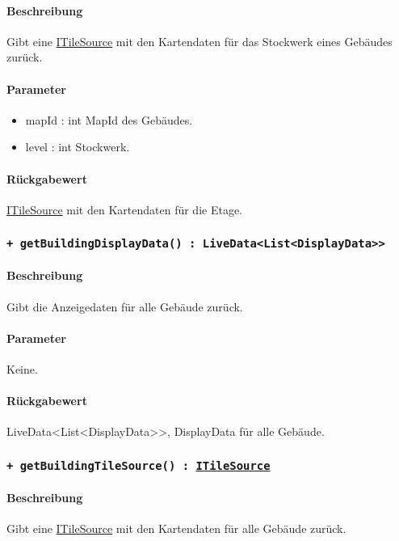 \paragraph*{Beschreibung}
Gibt eine \href{https://osmdroid.github.io/osmdroid/javadocAll/org/osmdroid/tileprovider/tilesource/ITileSource.html}
{ITileSource} mit den Kartendaten für das Stockwerk eines Gebäudes zurück.
\paragraph*{Parameter}
\begin{itemize}
    \item mapId : int MapId des Gebäudes.
    \item level : int Stockwerk.
\end{itemize}
\paragraph*{Rückgabewert}
\href{https://osmdroid.github.io/osmdroid/javadocAll/org/osmdroid/tileprovider/tilesource/ITileSource.html}
{ITileSource} mit den Kartendaten für die Etage.

\subsubsection{\texttt{+ getBuildingDisplayData() : LiveData<List<DisplayData>>}}%
\paragraph*{Beschreibung}
Gibt die Anzeigedaten für alle Gebäude zurück.
\paragraph*{Parameter}
Keine.
\paragraph*{Rückgabewert}
LiveData<List<DisplayData>>, DisplayData für alle Gebäude.

\subsubsection{\texttt{+ getBuildingTileSource() : \href{https://osmdroid.github.io/osmdroid/javadocAll/org/osmdroid/tileprovider/tilesource/ITileSource.html}
{ITileSource}}}%
\paragraph*{Beschreibung}
Gibt eine \href{https://osmdroid.github.io/osmdroid/javadocAll/org/osmdroid/tileprovider/tilesource/ITileSource.html}
{ITileSource} mit den Kartendaten für alle Gebäude zurück.
